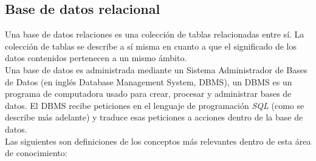 \subsection{Base de datos relacional}\label{sec:bd-r}
Una base de datos relaciones es una colección de tablas relacionadas entre sí. La colección de tablas se describe a sí misma en cuanto a que el significado de los datos contenidos pertenecen a un mismo ámbito\cite{DataBaseConcepts}.\\
Una base de datos es administrada mediante un Sistema Administrador de Bases de Datos (en inglés Database Management System, DBMS), un DBMS es un programa de computadora usado para crear, procesar y administrar bases de datos. El DBMS recibe peticiones en el lenguaje de programación \textit{SQL} (como se describe más adelante) y traduce esas peticiones a acciones dentro de la base de datos\cite{DataBaseConcepts}.\\
Las siguientes son definiciones de los conceptos más relevantes dentro de esta área de conocimiento:
